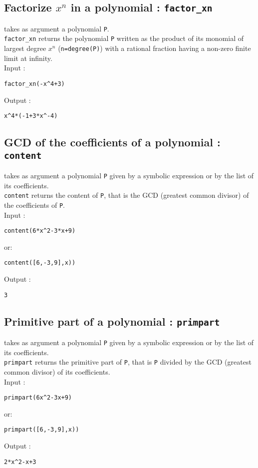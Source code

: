 \documentclass[a4paper,11pt]{book}
\begin{document}
\subsection{Factorize $x^n$ in a polynomial : {\tt factor\_xn}}
 takes as argument a polynomial {\tt P}.\\
{\tt factor\_xn} returns the polynomial {\tt P} written
as the product of its monomial of largest degree $x^n$ ({\tt n=degree(P)})
with a rational fraction having a non-zero finite limit at infinity.\\ 
 Input :
\begin{center}{\tt factor\_xn(-x\verb|^|4+3)}\end{center}
Output :
\begin{center}{\tt x\verb|^|4*(-1+3*x\verb|^|-4)}\end{center} 

\subsection{GCD of the coefficients of a polynomial : {\tt content}}
 takes as argument a polynomial {\tt P} given by 
a symbolic expression or by the list of its coefficients.\\
{\tt content} returns the content of {\tt P},
that is the GCD (greatest common divisor) of the coefficients of 
{\tt P}.\\
Input :
\begin{center}{\tt content(6*x\verb|^|2-3*x+9)}\end{center}
or:
\begin{center}{\tt content([6,-3,9],x))}\end{center}
Output :
\begin{center}{\tt  3}\end{center} 

\subsection{Primitive part of a polynomial : {\tt primpart}}
 takes as argument a polynomial {\tt P} given by a
symbolic expression or by the list of its coefficients.\\
{\tt primpart} returns the primitive part of {\tt P},
that is {\tt P} divided  by the GCD 
(greatest common divisor) of its coefficients.\\
Input :
\begin{center}{\tt primpart(6x\verb|^|2-3x+9)}\end{center}
or:
\begin{center}{\tt  primpart([6,-3,9],x))}\end{center}
Output :
\begin{center}{\tt 2*x\verb|^|2-x+3}\end{center} 
\end{document}
